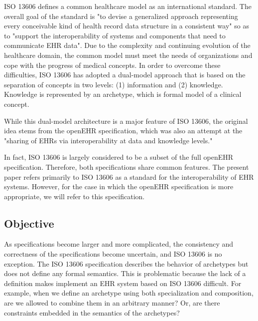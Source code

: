 \documentclass[preprint,3p,onecolumn,times,review]{elsarticle}
\begin{document}
ISO 13606 defines a common healthcare model as an international standard.
The overall goal of the standard is "to devise a generalized approach representing every conceivable kind of health record data structure in a consistent way"\cite[vi]{iso08:13606_healt_elect_part1} so as to "support the interoperability of systems and components that need to communicate EHR data"\cite[v]{iso08:13606_healt_elect_part1}.
Due to the complexity and continuing evolution of the healthcare domain, the common model must meet the needs of organizations and cope with the progress of medical concepts.
In order to overcome these difficulties, ISO 13606 has adopted a dual-model approach that is based on the separation of concepts in two levels: (1) information and (2) knowledge.
Knowledge is represented by an archetype, which is formal model of a clinical concept\cite[p.158]{jesualdo06:_ontol_infras_seman_integ_clinic_archet}.

While this dual-model architecture is a major feature of ISO 13606, the  original idea stems from the openEHR specification, which was also an attempt at the "sharing of EHRs via interoperability at data and knowledge levels."\cite[p.12]{beale08:_openeh_archit_overv}

In fact, ISO 13606 is largely considered to be a subset of the full openEHR specification\cite{peter:_relationship_cen13606_hl7_openehr,chen09:_archet_conversion_ehr_model}. Therefore, both specifications share common features.
The present paper refers primarily to ISO 13606 as a standard for the interoperability of EHR systems. However, for the case in which the openEHR specification is more appropriate, we will refer to this specification.

\subsection{Objective}

As specifications become larger and more complicated, the consistency and correctness of the specifications become uncertain, and ISO 13606 is no exception.
The ISO 13606 specification describes the behavior of archetypes but does not define any formal semantics.
This is problematic because the lack of a definition makes implement an EHR system based on ISO 13606 difficult.
For example, when we define an archetype using both specialization and composition, are we allowed to combine them in an arbitrary manner? Or, are there constraints embedded in the semantics of the archetypes?
\end{document}
